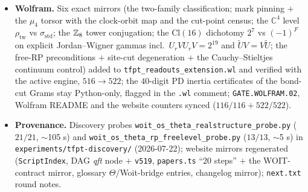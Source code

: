 \documentclass[11pt]{article}
\begin{document}
\begin{itemize}[leftmargin=1.5em]
\texttt{v519\_woit\_theta\_rp\_free.py} is cited via \texttt{veri} in
\texttt{tfpt\_research\_contracts} and \texttt{tfpt\_3}.
\item \textbf{Wolfram.} Six exact mirrors (the two-family classification; mark pinning $+$ the
$\mu_4$ torsor with the clock-orbit map and the cut-point census; the $\mathbb{C}^4$ level
$\rho_{\mathrm{tw}}$ vs $\sigma_{\mathrm{std}}$; the $\mathbb{Z}_8$ tower conjugation; the
$\mathrm{Cl}(16)$ dichotomy $2^7$ vs $(-1)^F$ on explicit Jordan--Wigner gammas incl.\
$U_rVU_rV=2^{19}$ and $\tilde UV=V\tilde U$; the free-RP preconditions $+$ site-cut
degeneration $+$ the Cauchy--Stieltjes continuum control) added to
\texttt{tfpt\_readouts\_extension.wl} and verified with the active engine, $516\to522$; the
$40$-digit PD inertia certificates of the bond-cut Grams stay Python-only, flagged in the
\texttt{.wl} comment; \texttt{GATE.WOLFRAM.02}, Wolfram README and the website counters synced
($116/116+522/522$).
\item \textbf{Provenance.} Discovery probes \texttt{woit\_os\_theta\_realstructure\_probe.py}
($21/21$, $\sim$105 s) and \texttt{woit\_os\_theta\_rp\_freelevel\_probe.py} ($13/13$,
$\sim$5 s) in \texttt{experiments/tfpt-discovery/} (2026-07-22); website mirrors regenerated
(\texttt{ScriptIndex}, DAG \emph{qft} node $+$ \texttt{v519}, \texttt{papers.ts} ``20 steps''
$+$ the WOIT-contract mirror, glossary $\Theta$/Woit-bridge entries, changelog mirror);
\texttt{next.txt} round notes.
\end{itemize}
\end{document}
